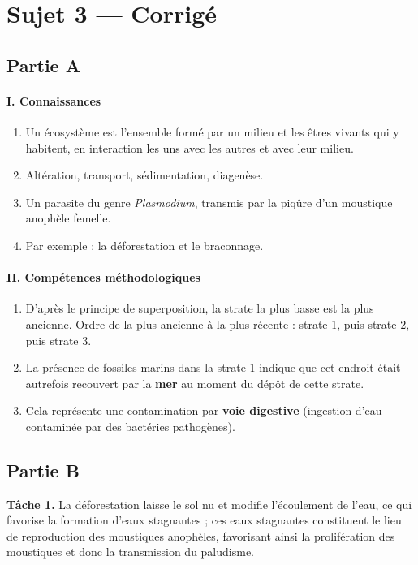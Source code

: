\section{Sujet 3 — Corrigé}

\subsection*{Partie A}

\paragraph{I. Connaissances}
\begin{enumerate}[label=\arabic*)]
\item Un écosystème est l'ensemble formé par un milieu et les êtres vivants qui y
habitent, en interaction les uns avec les autres et avec leur milieu.
\item Altération, transport, sédimentation, diagenèse.
\item Un parasite du genre \textit{Plasmodium}, transmis par la piqûre d'un
moustique anophèle femelle.
\item Par exemple : la déforestation et le braconnage.
\end{enumerate}

\paragraph{II. Compétences méthodologiques}
\begin{enumerate}[label=\arabic*)]
\item D'après le principe de superposition, la strate la plus basse est la plus
ancienne. Ordre de la plus ancienne à la plus récente : strate 1, puis strate 2, puis
strate 3.
\item La présence de fossiles marins dans la strate 1 indique que cet endroit était
autrefois recouvert par la \textbf{mer} au moment du dépôt de cette strate.
\item Cela représente une contamination par \textbf{voie digestive} (ingestion d'eau
contaminée par des bactéries pathogènes).
\end{enumerate}

\subsection*{Partie B}

\textbf{Tâche 1.} La déforestation laisse le sol nu et modifie l'écoulement de
l'eau, ce qui favorise la formation d'eaux stagnantes ; ces eaux stagnantes
constituent le lieu de reproduction des moustiques anophèles, favorisant ainsi la
prolifération des moustiques et donc la transmission du paludisme.


